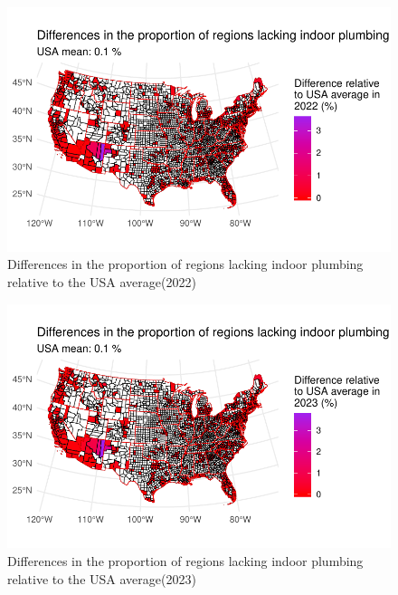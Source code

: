 \documentclass[
  letterpaper,
  DIV=11,
  numbers=noendperiod]{scrartcl}
\begin{document}
\begin{figure}[H]

{\centering \includegraphics{report_files/figure-pdf/fig-4-1.pdf}

}

\caption{\label{fig-4}Differences in the proportion of regions lacking
indoor plumbing relative to the USA average(2022)}

\end{figure}

\begin{figure}[H]

{\centering \includegraphics{report_files/figure-pdf/fig-5-1.pdf}

}

\caption{\label{fig-5}Differences in the proportion of regions lacking
indoor plumbing relative to the USA average(2023)}

\end{figure}
\end{document}
